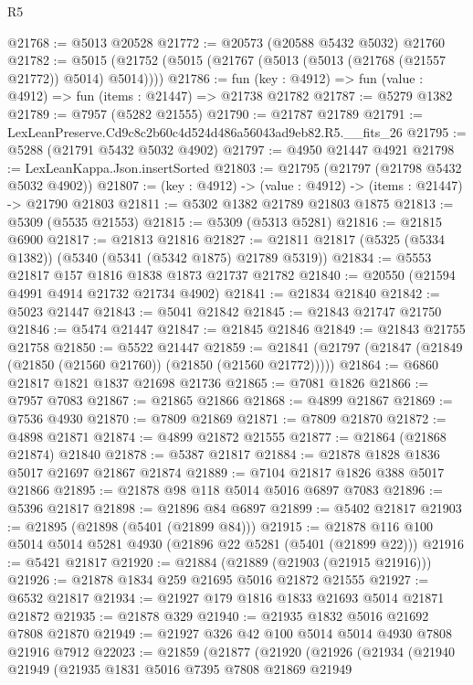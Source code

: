 \begin{lexlean}{R5}
\begin{coremodule}
@21768 := @5013 @20528
@21772 := @20573 (@20588 @5432 @5032) @21760
@21782 := @5015 (@21752 (@5015 (@21767 (@5013 (@5013 (@21768 (@21557 @21772)) @5014) @5014))))
@21786 := fun (key : @4912) => fun (value : @4912) => fun (items : @21447) => @21738 @21782
@21787 := @5279 @1382
@21789 := @7957 (@5282 @21555)
@21790 := @21787 @21789
@21791 := LexLeanPreserve.Cd9c8c2b60c4d524d486a56043ad9eb82.R5.__fits_26
@21795 := @5288 (@21791 @5432 @5032 @4902)
@21797 := @4950 @21447 @4921
@21798 := LexLeanKappa.Json.insertSorted
@21803 := @21795 (@21797 (@21798 @5432 @5032 @4902))
@21807 := (key : @4912) -> (value : @4912) -> (items : @21447) -> @21790 @21803
@21811 := @5302 @1382 @21789 @21803 @1875
@21813 := @5309 (@5535 @21553)
@21815 := @5309 (@5313 @5281)
@21816 := @21815 @6900
@21817 := @21813 @21816
@21827 := @21811 @21817 (@5325 (@5334 @1382)) (@5340 (@5341 (@5342 @1875) @21789 @5319))
@21834 := @5553 @21817 @157 @1816 @1838 @1873 @21737 @21782
@21840 := @20550 (@21594 @4991 @4914 @21732 @21734 @4902)
@21841 := @21834 @21840
@21842 := @5023 @21447
@21843 := @5041 @21842
@21845 := @21843 @21747 @21750
@21846 := @5474 @21447
@21847 := @21845 @21846
@21849 := @21843 @21755 @21758
@21850 := @5522 @21447
@21859 := @21841 (@21797 (@21847 (@21849 (@21850 (@21560 @21760)) (@21850 (@21560 @21772)))))
@21864 := @6860 @21817 @1821 @1837 @21698 @21736
@21865 := @7081 @1826
@21866 := @7957 @7083
@21867 := @21865 @21866
@21868 := @4899 @21867
@21869 := @7536 @4930
@21870 := @7809 @21869
@21871 := @7809 @21870
@21872 := @4898 @21871
@21874 := @4899 @21872 @21555
@21877 := @21864 (@21868 @21874) @21840
@21878 := @5387 @21817
@21884 := @21878 @1828 @1836 @5017 @21697 @21867 @21874
@21889 := @7104 @21817 @1826 @388 @5017 @21866
@21895 := @21878 @98 @118 @5014 @5016 @6897 @7083
@21896 := @5396 @21817
@21898 := @21896 @84 @6897
@21899 := @5402 @21817
@21903 := @21895 (@21898 (@5401 (@21899 @84)))
@21915 := @21878 @116 @100 @5014 @5014 @5281 @4930 (@21896 @22 @5281 (@5401 (@21899 @22)))
@21916 := @5421 @21817
@21920 := @21884 (@21889 (@21903 (@21915 @21916)))
@21926 := @21878 @1834 @259 @21695 @5016 @21872 @21555
@21927 := @6532 @21817
@21934 := @21927 @179 @1816 @1833 @21693 @5014 @21871 @21872
@21935 := @21878 @329
@21940 := @21935 @1832 @5016 @21692 @7808 @21870
@21949 := @21927 @326 @42 @100 @5014 @5014 @4930 @7808 @21916 @7912
@22023 := @21859
    (@21877
      (@21920
        (@21926
          (@21934
            (@21940
              @21949
              (@21935
                @1831
                @5016
                @7395
                @7808
                @21869
                @21949

\end{coremodule}
\end{lexlean}
